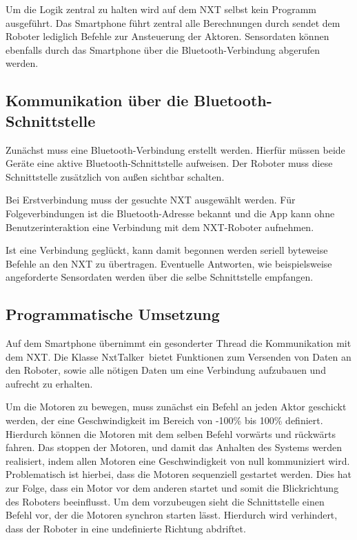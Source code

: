 Um die Logik zentral zu halten wird auf dem NXT selbst kein Programm ausgeführt. Das Smartphone führt zentral alle Berechnungen durch sendet dem Roboter lediglich Befehle zur Ansteuerung der Aktoren. Sensordaten können ebenfalls durch das Smartphone über die Bluetooth-Verbindung abgerufen werden.

\subsection{Kommunikation über die Bluetooth-Schnittstelle}

Zunächst muss eine Bluetooth-Verbindung erstellt werden. Hierfür müssen beide Geräte eine aktive Bluetooth-Schnittstelle aufweisen. Der Roboter muss diese Schnittstelle zusätzlich von außen sichtbar schalten.

Bei Erstverbindung muss der gesuchte NXT ausgewählt werden. Für Folgeverbindungen ist die Bluetooth-Adresse bekannt und die App kann ohne Benutzerinteraktion eine Verbindung mit dem NXT-Roboter aufnehmen.

Ist eine Verbindung geglückt, kann damit begonnen werden seriell byteweise Befehle an den NXT zu übertragen. Eventuelle Antworten, wie beispielsweise angeforderte Sensordaten werden über die selbe Schnittstelle empfangen.

\subsection{Programmatische Umsetzung}

Auf dem Smartphone übernimmt ein gesonderter Thread die Kommunikation mit dem NXT. Die Klasse \glqq NxtTalker\grqq\ bietet Funktionen zum Versenden von Daten an den Roboter, sowie alle nötigen Daten um eine Verbindung aufzubauen und aufrecht zu erhalten.

Um die Motoren zu bewegen, muss zunächst ein Befehl an jeden Aktor geschickt werden, der eine Geschwindigkeit im Bereich von -100\% bis 100\% definiert. Hierdurch können die Motoren mit dem selben Befehl vorwärts und rückwärts fahren. Das stoppen der Motoren, und damit das Anhalten des Systems werden realisiert, indem allen Motoren eine Geschwindigkeit von null kommuniziert wird. Problematisch ist hierbei, dass die Motoren sequenziell gestartet werden. Dies hat zur Folge, dass ein Motor vor dem anderen startet und somit die Blickrichtung des Roboters beeinflusst. Um dem vorzubeugen sieht die Schnittstelle einen Befehl vor, der die Motoren synchron starten lässt. Hierdurch wird verhindert, dass der Roboter in eine undefinierte Richtung abdriftet.
